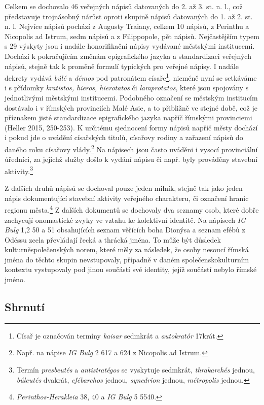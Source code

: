 Celkem se dochovalo 46 veřejných nápisů datovaných do 2. až 3. st. n. l., což představuje trojnásobný nárůst oproti skupině nápisů datovaných do 1. až 2. st. n. l. Nejvíce nápisů pochází z Augusty Traiany, celkem 10 nápisů, z Perinthu a Nicopolis ad Istrum, sedm nápisů a z Filippopole, pět nápisů. Nejčastějším typem s 29 výskyty jsou i nadále honorifikační nápisy vydávané městskými institucemi. Dochází k pokračujícím změnám epigrafického jazyka a standardizaci veřejných nápisů, stejně tak k proměně formulí typických pro veřejné nápisy. I nadále dekrety vydává {\em búlé} a {\em démos} pod patronátem císaře\footnote{Císař je označován termíny {\em kaisar} sedmkrát a {\em autokratór} 17krát.}, nicméně nyní se setkáváme i s přídomky {\em kratistos, hieros, hierotatos} či {\em lamprotatos}, které jsou spojovány s jednotlivými městskými institucemi. Podobného označení se městským institucím dostávalo i v římských provinciích Malé Asie, a to přibližně ve stejné době, což je příznakem jisté standardizace epigrafického jazyka napříč římskými provinciemi (Heller 2015, 250-253). K určitému sjednocení formy nápisů napříč městy dochází i pokud jde o uvádění císařských titulů, císařovy rodiny a zařazení nápisů do daného roku císařovy vlády.\footnote{Např. na nápise {\em IG Bulg} 2 617 a 624 z Nicopolis ad Istrum.} Na nápisech jsou často uváděni i vysocí provinciální úředníci, za jejichž služby došlo k vydání nápisu či např. byly prováděny stavební aktivity.\footnote{Termín {\em presbeutés} a {\em antistratégos} se vyskytuje sedmkrát, {\em thrakarchés} jednou, {\em búleutés} dvakrát, {\em efébarchos} jednou, {\em synedrion} jednou, {\em métropolis} jednou.}

Z dalších druhů nápisů se dochoval pouze jeden milník, stejně tak jako jeden nápis dokumentující stavební aktivity veřejného charakteru, či označení hranic regionu města.\footnote{{\em Perinthos-Herakleia} 38, 40 a {\em IG Bulg} 5 5540.} Z dalších dokumentů se dochovaly dva seznamy osob, které dobře zachycují onomastické zvyky ve vztahu ke kolektivní identitě. Na nápisech {\em IG Bulg} 1,2 50 a 51 obsahujících seznam věřících boha Dionýsa a seznam efébů z Odéssu zcela převládají řecká a thrácká jména. To může být důsledek kulturněspolečenských norem, které měly za následek, že osoby nesoucí římská jména do těchto skupin nevstupovaly, případně v daném společenskokulturním kontextu vystupovaly pod jinou součástí své identity, jejíž součástí nebylo římské jméno.

\subsection[shrnutí-18]{Shrnutí}

